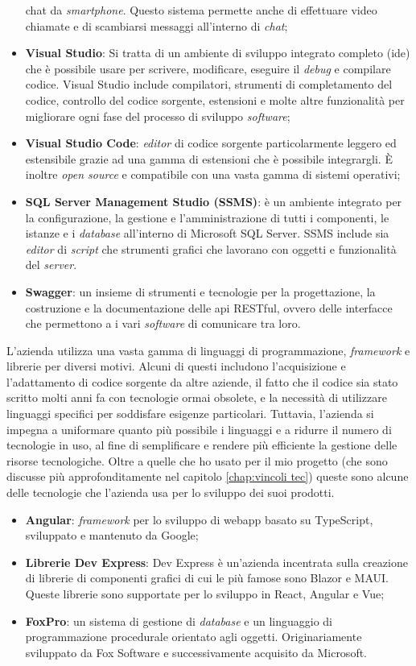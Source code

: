 \begin{itemize}
          chat da \textit{smartphone}. Questo sistema permette anche di effettuare video chiamate e di scambiarsi messaggi all'interno di \textit{chat};
    \item \textbf{Visual Studio}: Si tratta di un ambiente di sviluppo integrato completo (\gls{ide}) che è possibile usare per scrivere, modificare, 
          eseguire il \textit{debug} e compilare codice. Visual Studio include compilatori, strumenti di completamento del codice, 
          controllo del codice sorgente, estensioni e molte altre funzionalità per migliorare ogni fase del processo di sviluppo \textit{software};
    \item \textbf{Visual Studio Code}: \textit{editor} di codice sorgente particolarmente leggero ed estensibile grazie ad una gamma di estensioni 
          che è possibile integrargli. È inoltre \textit{open source} e compatibile con una vasta gamma di sistemi operativi;
    \item \textbf{SQL Server Management Studio (SSMS)}: è un ambiente integrato per la configurazione, la gestione e l'amministrazione di tutti i componenti, 
          le istanze e i \textit{database} all'interno di Microsoft SQL Server. SSMS include sia \textit{editor} di \textit{script} che strumenti grafici che lavorano con 
          oggetti e funzionalità del \textit{server}.
    \item \textbf{Swagger}: un insieme di strumenti e tecnologie per la progettazione, la costruzione e la documentazione delle \gls{api} RESTful, ovvero delle interfacce 
          che permettono a i vari \textit{software} di comunicare tra loro.
\end{itemize}
L'azienda utilizza una vasta gamma di linguaggi di programmazione, \textit{framework} e librerie per diversi motivi. Alcuni di questi includono l'acquisizione 
e l'adattamento di codice sorgente da altre aziende, il fatto che il codice sia stato scritto molti anni fa con tecnologie ormai obsolete, e la necessità di utilizzare 
linguaggi specifici per soddisfare esigenze particolari. Tuttavia, l'azienda si impegna a uniformare quanto più possibile i linguaggi e a ridurre il numero di tecnologie in 
uso, al fine di semplificare e rendere più efficiente la gestione delle risorse tecnologiche. Oltre a quelle che ho usato per il mio progetto (che sono discusse 
più approfonditamente nel capitolo \ref{chap:vincoli tec}) queste sono alcune delle tecnologie che l'azienda usa per lo sviluppo dei suoi prodotti.
\begin{itemize}
    \item \textbf{Angular}: \textit{framework} per lo sviluppo di \gls{webapp} basato su TypeScript, sviluppato e mantenuto da Google;
    \item \textbf{Librerie Dev Express}: Dev Express è un'azienda incentrata sulla creazione di librerie di componenti grafici di cui le più famose sono 
          Blazor e MAUI. Queste librerie sono supportate per lo sviluppo in React, Angular e Vue;
    \item \textbf{FoxPro}: un sistema di gestione di \textit{database} e un linguaggio di programmazione procedurale orientato agli oggetti. Originariamente sviluppato 
          da Fox Software e successivamente acquisito da Microsoft. 
\end{itemize}

